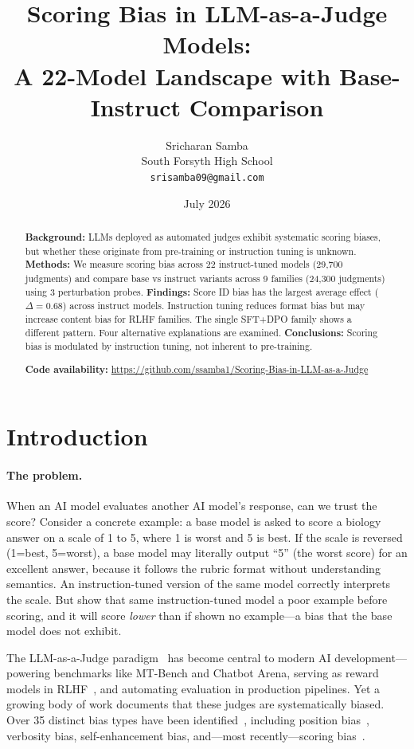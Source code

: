 \documentclass[11pt,twocolumn]{article}
\title{\textbf{Scoring Bias in LLM-as-a-Judge Models:\\
A 22-Model Landscape with Base-Instruct Comparison}}
\author{
  Sricharan Samba\\
  South Forsyth High School\\
  \texttt{srisamba09@gmail.com}
}
\date{July 2026}
\begin{document}
\maketitle

\begin{abstract}
\noindent\textbf{Background:} LLMs deployed as automated judges exhibit systematic scoring biases, but whether these originate from pre-training or instruction tuning is unknown. \textbf{Methods:} We measure scoring bias across 22 instruct-tuned models (29,700 judgments) and compare base vs instruct variants across 9 families (24,300 judgments) using 3 perturbation probes. \textbf{Findings:} Score ID bias has the largest average effect ($\Delta=0.68$) across instruct models. Instruction tuning reduces format bias but may increase content bias for RLHF families. The single SFT+DPO family shows a different pattern. Four alternative explanations are examined. \textbf{Conclusions:} Scoring bias is modulated by instruction tuning, not inherent to pre-training.

\noindent\textbf{Code availability:} \url{https://github.com/ssamba1/Scoring-Bias-in-LLM-as-a-Judge}
\end{abstract}

\section{Introduction}

\paragraph{The problem.}
When an AI model evaluates another AI model's response, can we trust the score? Consider a concrete example: a base model is asked to score a biology answer on a scale of 1 to 5, where 1 is worst and 5 is best. If the scale is reversed (1=best, 5=worst), a base model may literally output ``5'' (the worst score) for an excellent answer, because it follows the rubric format without understanding semantics. An instruction-tuned version of the same model correctly interprets the scale. But show that same instruction-tuned model a poor example before scoring, and it will score \emph{lower} than if shown no example---a bias that the base model does not exhibit.

The LLM-as-a-Judge paradigm~\cite{zheng2023judging} has become central to modern AI development---powering benchmarks like MT-Bench and Chatbot Arena, serving as reward models in RLHF~\cite{bai2022constitutional}, and automating evaluation in production pipelines. Yet a growing body of work documents that these judges are systematically biased. Over 35 distinct bias types have been identified~\cite{ye2024justice,gu2024survey}, including position bias~\cite{wang2023large}, verbosity bias, self-enhancement bias, and---most recently---scoring bias~\cite{li2025scoring}.
\end{document}
